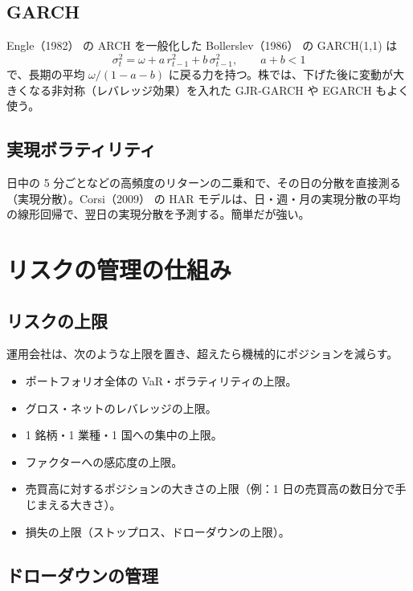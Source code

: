\subsection{GARCH}

Engle（1982）\cite{engle1982} の ARCH を一般化した Bollerslev（1986）\cite{bollerslev1986} の GARCH(1,1) は
\begin{equation}
\sigma_t^2 = \omega + a\,r_{t-1}^2 + b\,\sigma_{t-1}^2, \qquad a + b < 1
\end{equation}
で、長期の平均 $\omega/(1-a-b)$ に戻る力を持つ。株では、下げた後に変動が大きくなる非対称（レバレッジ効果）を入れた GJR-GARCH や EGARCH もよく使う。

\subsection{実現ボラティリティ}

日中の 5 分ごとなどの高頻度のリターンの二乗和で、その日の分散を直接測る（実現分散）。Corsi（2009）\cite{corsi2009} の HAR モデルは、日・週・月の実現分散の平均の線形回帰で、翌日の実現分散を予測する。簡単だが強い。

\section{リスクの管理の仕組み}

\subsection{リスクの上限}

運用会社は、次のような上限を置き、超えたら機械的にポジションを減らす。

\begin{itemize}
\item ポートフォリオ全体の VaR・ボラティリティの上限。
\item グロス・ネットのレバレッジの上限。
\item 1 銘柄・1 業種・1 国への集中の上限。
\item ファクターへの感応度の上限。
\item 売買高に対するポジションの大きさの上限（例：1 日の売買高の数日分で手じまえる大きさ）。
\item 損失の上限（ストップロス、ドローダウンの上限）。
\end{itemize}

\subsection{ドローダウンの管理}

